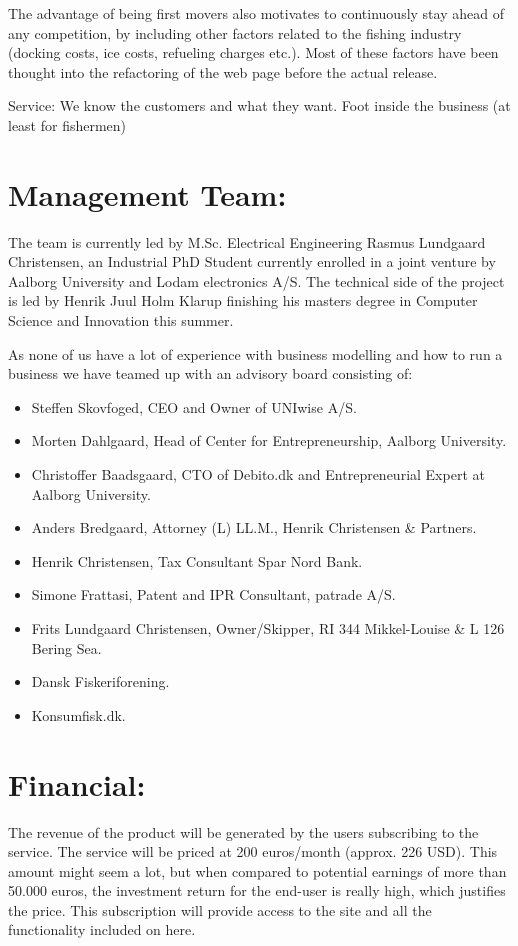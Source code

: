 \documentclass[12pt]{article}
\begin{document}
The advantage of being first movers also motivates to continuously stay ahead of any competition, by including other factors related to the fishing industry (docking costs, ice costs, refueling charges etc.). Most of these factors have been thought into the refactoring of the web page before the actual release. 

Service: We know the customers and what they want. 
Foot inside the business (at least for fishermen)

\section{Management Team:}
The team is currently led by M.Sc. Electrical Engineering Rasmus Lundgaard Christensen, an Industrial PhD Student currently enrolled in a joint venture by Aalborg University and Lodam electronics A/S. The technical side of the project is led by Henrik Juul Holm Klarup finishing his masters degree in Computer Science and Innovation this summer.

As none of us have a lot of experience with business modelling and how to run a business we have teamed up with an advisory board consisting of:
\begin{itemize}
	\item Steffen Skovfoged, CEO and Owner of UNIwise A/S. 
	\item Morten Dahlgaard, Head of Center for Entrepreneurship, Aalborg University.
	\item Christoffer Baadsgaard, CTO of Debito.dk and Entrepreneurial Expert at Aalborg University. 
	\item Anders Bredgaard, Attorney (L) LL.M., Henrik Christensen \& Partners.
	\item Henrik Christensen, Tax Consultant Spar Nord Bank.
	\item Simone Frattasi, Patent and IPR Consultant, patrade A/S.
	\item Frits Lundgaard Christensen, Owner/Skipper, RI 344 Mikkel-Louise \& L 126 Bering Sea.
	\item Dansk Fiskeriforening.
	\item Konsumfisk.dk.
\end{itemize}

\section{Financial:}
The revenue of the product will be generated by the users subscribing to the service. The service will be priced at 200 euros/month (approx. 226 USD). This amount might seem a lot, but when compared to potential earnings of more than 50.000 euros, the investment return for the end-user is really high, which justifies the price. This subscription will provide access to the site and all the functionality included on here. 
\end{document}
